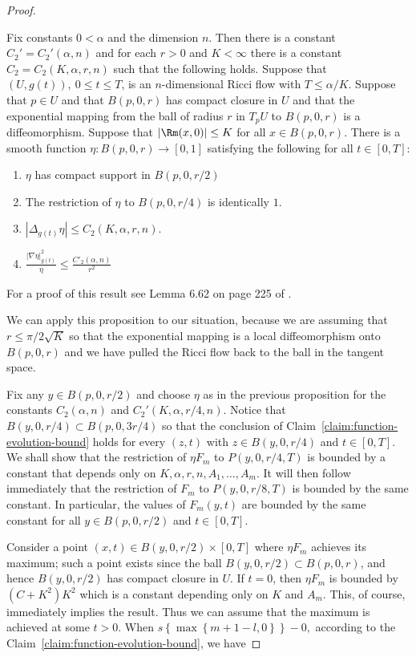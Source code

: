 \begin{proof}
\begin{proposition}\label{prop:parabolic-cutoff-function}
\label{etaprop}
Fix constants $0<\alpha$ and the dimension $n$. Then there is a constant
$C_2'=C_2'(\alpha,n)$ and for each $r>0$ and $K<\infty$ there is a constant
$C_2=C_2(K,\alpha,r,n)$ such that the following holds. Suppose that $(U,g(t)),\
0\le t\le T$,  is an $n$-dimensional Ricci flow  with $T\le \alpha/K$. Suppose
that $p\in U$ and that $B(p,0,r)$ has compact closure in $U$ and that the
exponential mapping from the ball of radius $r$ in $T_pU$ to $B(p,0,r)$ is a
diffeomorphism. Suppose that $|\Rm(x,0)|\le K$ for all $x\in B(p,0,r)$. There is
a smooth function $\eta\colon B(p,0,r)\to [0,1]$ satisfying the following for
all $t\in [0,T]$:
\begin{enumerate}
\item $\eta$ has compact support in $B(p,0,r/2)$
\item The restriction of $\eta$ to $B(p,0,r/4)$ is identically $1$.
\item $|\Delta_{g(t)} \eta|\le C_2(K,\alpha,r,n)$.
\item $\frac{|\nabla \eta|_{g(t)}^2}{\eta}\le \frac{C'_2(\alpha,n)}{r^2}$
\end{enumerate}
\end{proposition}

For a proof of this result see Lemma 6.62 on page 225 of
\cite{ChowLuNi}.

We can apply this proposition to our situation, because we are
assuming that $r\le \pi/2\sqrt{K}$ so that the exponential mapping
is a local diffeomorphism onto $B(p,0,r)$ and we have pulled the
Ricci flow back to the ball in the tangent space.

Fix any $y\in B(p,0,r/2)$ and choose $\eta$ as in the previous
proposition for the constants $C_2(\alpha,n)$ and
$C_2'(K,\alpha,r/4,n)$. Notice that $B(y,0,r/4)\subset B(p,0,3r/4)$
so that the conclusion of Claim~\ref{claim:function-evolution-bound} holds for every $(z,t)$
with $z\in B(y,0,r/4)$ and $t\in [0,T]$.  We shall show that the restriction of $\eta
F_m$ to $P(y,0,r/4,T)$ is bounded by a constant that depends only on
$K,\alpha,r,n,A_1,\ldots,A_m$. It will then follow immediately that
the restriction of $F_m$ to $P(y,0,r/8,T)$ is bounded by the same
constant. In particular, the values of $F_m(y,t)$ are bounded by the
same constant for all $y\in B(p,0,r/2)$ and $t\in [0,T]$.

 Consider a point $(x,t)\in B(y,0,r/2)\times
[0,T]$ where $\eta F_m$ achieves its maximum; such a point exists
since the ball $B(y,0,r/2)\subset B(p,0,r)$, and hence $B(y,0,r/2)$
has compact closure in $U$. If $t=0$, then $\eta F_m$ is bounded by
$(C+K^2)K^2$ which is a constant depending only on $K$ and $A_m$.
This, of course, immediately implies the result. Thus we can assume
that the maximum is achieved at some $t>0$. When $s\left\{
\max\left\{ m+1-l,0\right\} \right\}  -0,$ according to the
Claim~\ref{claim:function-evolution-bound}, we have


\end{proof}

